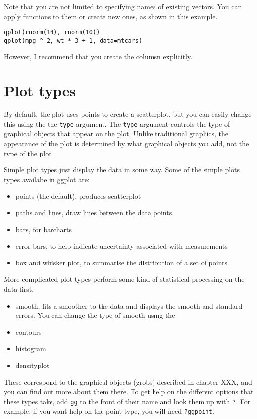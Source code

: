 Note that you are not limited to specifying names of existing vectors.  You can apply functions to them or create new ones, as shown in this example.

\begin{verbatim}
qplot(rnorm(10), rnorm(10))
qplot(mpg ^ 2, wt * 3 + 1, data=mtcars)
\end{verbatim}

However, I recommend that you create the columsn explicitly.

\section{Plot types}\label{sec:plot_types}

By default, the plot uses points to create a scatterplot, but you can easily change this using the the {\tt type} argument.  The {\tt type} argument controls the type of graphical objects that appear on the plot.  Unlike traditional graphics, the appearance of the plot is determined by what graphical objects you add, not the type of the plot. 

Simple plot types just display the data in some way.  Some of the simple plots types availabe in ggplot are:

\begin{itemize}
	\item points (the default), produces scatterplot
	\item paths and lines, draw lines between the data points.  
	\item bars, for barcharts
	\item error bars, to help indicate uncertainty associated with measurements
	\item box and whisker plot, to summarise the distribution of a set of points
\end{itemize}

More complicated plot types perform some kind of statistical processing on the data first.

\begin{itemize}
	\item smooth, fits a smoother to the data and displays the smooth and standard errors.  You can change the type of smooth using the 
	\item contours
	\item histogram
	\item densityplot
\end{itemize}

These correspond to the graphical objects (grobs) described in chapter XXX, and you can find out more about them there.  To get help on the different options that these types take, add {\tt gg} to the front of their name and look them up with {\tt ?}. For example, if you want help on the point type, you will need {\tt ?ggpoint}. 

